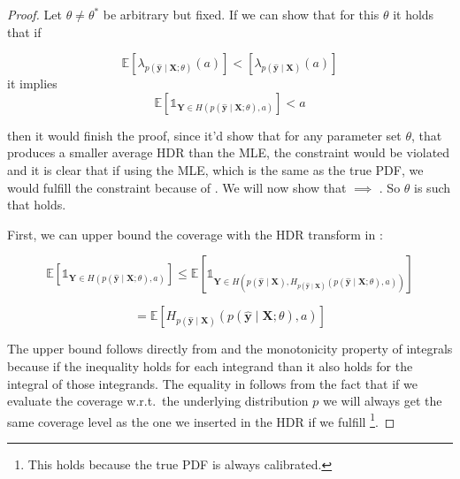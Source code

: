 \begin{proof}
    Let $\theta \neq \theta^*$ be arbitrary but fixed. If we can show that for this $\theta$ it holds that if

    \begin{equation}
        \mathbb{E} \left[ \lambda_{p(\mathbf{\hat{y}}\mid\mathbf{X};\theta)}(a)\right]
        <
        \left[\lambda_{p(\mathbf{\hat{y}}\mid\mathbf{X})}(a) \right]
        \label{eq:inequality_00}
    \end{equation}
    it implies
    \begin{equation}
        \mathbb{E} \left[ \mathds{1}_{\mathbf{Y} \in
        H(p(\mathbf{\hat{y}}\mid \mathbf{X}; \theta), a)} \right] < a
        \label{eq:inequality_01}
    \end{equation}

    then it would finish the proof, since it'd show that for any parameter set $\theta$, that produces a smaller average HDR than the MLE, the constraint would be violated and it is clear that if using the MLE, which is the same as the true PDF, we would fulfill the constraint because of . We will now show that  $\implies$ . So  $\theta$ is such that  holds.

    First, we can upper bound the coverage with the HDR transform in :

    \begin{equation}
        \mathbb{E} \left[ \mathds{1}_{\mathbf{Y} \in
        H(p(\mathbf{\hat{y}}\mid \mathbf{X}; \theta), a)} \right]
        \leq
        \mathbb{E} \left[ \mathds{1}_{\mathbf{Y} \in
        H(p(\mathbf{\hat{y}} \mid \mathbf{X}), H_{p(\hat{\mathbf{y}}\mid \mathbf{X})}(p(\mathbf{\hat{y}}\mid
        \mathbf{X};
        \theta), a))} \right]
        \label{eq:upper_bound}
    \end{equation}

    \begin{equation}
        = \mathbb{E}\left[H_{p(\hat{\mathbf{y}}\mid \mathbf{X})}(p(\mathbf{\hat{y}}\mid \mathbf{X}; \theta),
            a)
            \right]
        \label{eq:upper_bound_2}
    \end{equation}

    The upper bound follows directly from  and the monotonicity property of integrals because if the inequality holds for each integrand than it also holds for the integral of those integrands. The equality in  follows from the fact that if we evaluate the coverage w.r.t.\ the underlying distribution $p$ we will always get the same coverage level as the one we inserted in the HDR if we fulfill \footnote{This holds because the true PDF is always calibrated.}.


\end{proof}
